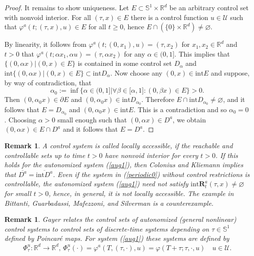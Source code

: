 \documentclass{siamltex}%
\newtheorem{remark}[theorem]{Remark}
\begin{document}
\begin{proof}
It remains to show uniqueness. Let $E\subset\mathbb{S}^{1}\times\mathbb{R}%
^{d}$ be an arbitrary control set with nonvoid interior. For all $(\tau,x)\in
E$ there is a control function $u\in\mathcal{U}$ such that $\varphi
^{a}(t;(\tau,x),u)\in E$ for all $t\geq0$, hence $E\cap\left(  \{0\}\times
\mathbb{R}^{d}\right)  \not =\varnothing$.

By linearity, it follows from $\varphi^{a}(t;(0,x_{1}),u)=(\tau,x_{2})$ for
$x_{1},x_{2}\in\mathbb{R}^{d}$ and $t>0$ that $\varphi^{a}(t;\alpha
x_{1},\alpha u)=(\tau,\alpha x_{2})$ for any $\alpha\in(0,1]$. This implies
that $\{(0,\alpha x)\left\vert (0,x)\in E\right.  \}$ is contained in some
control set $D_{\alpha}$ and $\mathrm{int}\{(0,\alpha x)\left\vert (0,x)\in
E\right.  \}\subset\mathrm{int}D_{\alpha}$. Now choose any $(0,x)\in
\mathrm{int}E$ and suppose, by way of contradiction, that
\[
\alpha_{0}:=\inf\{\alpha\in(0,1]\left\vert \forall\beta\in\lbrack
\alpha,1]:(0,\beta x)\in E\right.  \}>0.
\]
Then $(0,\alpha_{0}x)\in\partial E$ and $(0,\alpha_{0}x)\in\mathrm{int}%
D_{\alpha_{0}}$. Therefore $E\cap\mathrm{int}D_{\alpha_{0}}\not =\varnothing$,
and it follows that $E=D_{\alpha_{0}}$ and $(0,\alpha_{0}x)\in\mathrm{int}E$.
This is a contradiction and so $\alpha_{0}=0$. Choosing $\alpha>0$ small
enough such that $(0,\alpha x)\in D^{a}$, we obtain $(0,\alpha x)\in E\cap
D^{a}$ and it follows that $E=D^{a}$.
\end{proof}

\begin{remark}
A control system is called locally accessible, if the reachable and
controllable sets up to time $t>0$ have nonvoid interior for every $t>0$. If
this holds for the autonomized system (\ref{aug1}), then Colonius and Kliemann
\cite[Lemma 3.2.13(i)]{ColK00} implies that $\overline{D^{a}}=\overline
{\mathrm{int}D^{a}}$. Even if the system in (\ref{periodic0}) without control
restrictions is controllable, the autonomized system (\ref{aug1}) need not
satisfy $\mathrm{int}\mathbf{R}_{t}^{a}(\tau,x)\not =\varnothing$ for small
$t>0$, hence, in general, it is not locally accessible. The example in
Bittanti, Guarbadassi, Mafezzoni, and Silverman \cite[p. 38]{Bit78} is a counterexample.
\end{remark}

\begin{remark}
\label{RemarkGayer}Gayer \cite[Theorem 3]{Gayer05} relates the control sets of
autonomized (general nonlinear) control systems to control sets of
discrete-time systems depending on $\tau\in\mathbb{S}^{1}$defined by
Poincar\'{e} maps. For system (\ref{aug1}) these systems are defined by%
\[
\Phi_{\tau}^{u}:\mathbb{R}^{d}\rightarrow\mathbb{R}^{d},\,\Phi_{\tau}%
^{u}(\cdot)=\varphi^{a}(T,(\tau,\cdot),u)=\varphi(T+\tau;\tau,\cdot,u)\quad
u\in\mathcal{U}.
\]

\end{remark}
\end{document}
